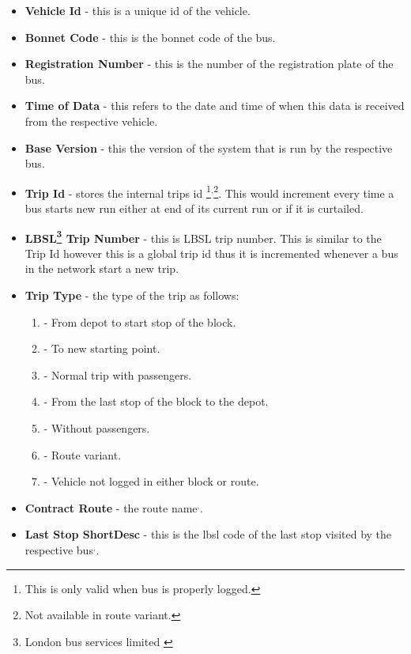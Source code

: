 \begin{itemize}
	\item \textbf{Vehicle Id} - this is a unique id of the vehicle.
	\item \textbf{Bonnet Code} - this is the bonnet code of the bus.
	\item \textbf{Registration Number} - this is the number of the registration plate of the bus. 
	\item \textbf{Time of Data} -  this refers to the date and time of when this data is received from the respective vehicle.
	\item \textbf{Base Version} - this the version of the system that is run by the respective bus.
	\item \textbf{Trip Id} - stores the internal trips id
	\footnote{\label{loggedProperly}This is only valid when bus is properly logged.}$^{,}$\footnote{\label{routeVariant}Not available in route variant.}. This would increment every time a bus starts new run either at end of its current run or if it is curtailed.
	\item \textbf{LBSL\footnote{London bus services limited \cite{lbsl}} Trip Number} - this is LBSL trip number\footnotemark[\ref{loggedProperly}]. This is similar to the Trip Id however this is a global trip id thus it is incremented whenever a bus in the network start a new trip.
	\item \textbf{Trip Type} - the type of the trip as follows:
\begin{enumerate}
\item - From depot to start stop of the block.
\item - To new starting point.
\item - Normal trip with passengers.
\item - From the last stop of the block to the depot.
\item - Without passengers.
\item - Route variant.
\item - Vehicle not logged in either block or route.
\end{enumerate}
	\item \textbf{Contract Route} - the route name\footnotemark[\ref{loggedProperly}]$^{,}$\footnotemark[\ref{routeVariant}].
	\item \textbf{Last Stop ShortDesc} - this is the lbsl code of the last stop visited by the respective bus\footnotemark[\ref{loggedProperly}]$^{,}$\footnotemark[\ref{routeVariant}].

\end{itemize}
